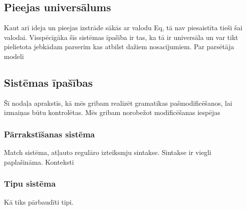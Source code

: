 \subsection{Pieejas universālums}
Kaut arī ideja un pieejas izstrāde sākās ar valodu Eq, tā nav piesaistīta tieši šai valodai. Visspēcīgāka šīs sistēmas īpašība ir tas, ka tā ir universāla un var tikt pielietota jebkādam parserim kas atbilst dažiem nosacījumiem. 
Par parsētāja modeli

\subsection{Sistēmas īpašības}
Šī nodaļa aprakstīs, kā mēs gribam realizēt gramatikas pašmodificēšanos, lai izmaiņas būtu kontrolētas.
Mēs gribam norobežot modificēšanas iespējas

\subsubsection{Pārrakstīšanas sistēma}
Match sistēma, atļauto regulāro izteiksmju sintakse. Sintakse ir viegli paplašināma.
Konteksti
\subsubsection{Tipu sistēma}
Kā tiks pārbaudīti tipi.